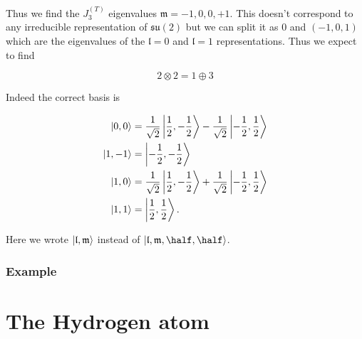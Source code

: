 \documentclass[12pt, a4paper]{article}
\begin{document}
\begin{example}
Thus we find the \( J^{(T)}_3 \) eigenvalues \(\mathfrak{m}=-1, 0, 0, +1\). This doesn't correspond to any irreducible representation of \( \mathfrak{su}(2) \) but we can split it as \(0\) and \((-1, 0, 1)\) which are the eigenvalues of the \( \mathfrak{l} = 0 \) and \( \mathfrak{l} = 1 \) representations. Thus we expect to find

\[
2 \otimes 2 = 1 \oplus 3
\]

Indeed the correct basis is

\[\begin{aligned}
\ket{0, 0} &= \frac{1}{\sqrt{2}} \ket{\frac{1}{2}, -\frac{1}{2}} - \frac{1}{\sqrt{2}} \ket{-\frac{1}{2}, \frac{1}{2}} \\
\ket{1, -1} &= \ket{-\frac{1}{2}, -\frac{1}{2}} \\
\ket{1, 0} &= \frac{1}{\sqrt{2}} \ket{\frac{1}{2}, -\frac{1}{2}} + \frac{1}{\sqrt{2}} \ket{-\frac{1}{2}, \frac{1}{2}} \\
\ket{1, 1} &= \ket{\frac{1}{2}, \frac{1}{2}}.
\end{aligned}\]

\begin{mdnote}
    Here we wrote \(\ket{\mathfrak{l},\mathfrak{m}}\) instead of \(\ket{\mathfrak{l},\mathfrak{m},\half,\half}\).
\end{mdnote}

\end{example}

\subsubsection{Example}



\section{The Hydrogen atom}





\end{document}
